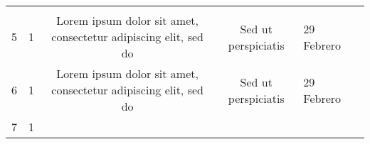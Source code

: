\documentclass[]{book}
\begin{document}
\begin{longtable}[]{@{}lcccll@{}}
\begin{minipage}[t]{0.22\columnwidth}
\strut
\end{minipage}\tabularnewline
\begin{minipage}[t]{0.02\columnwidth}\raggedright\strut
5\strut
\end{minipage} & \begin{minipage}[t]{0.16\columnwidth}\centering\strut
1\strut
\end{minipage} & \begin{minipage}[t]{0.27\columnwidth}\centering\strut
Lorem ipsum dolor sit amet, consectetur adipiscing elit, sed do\strut
\end{minipage} & \begin{minipage}[t]{0.09\columnwidth}\centering\strut
Sed ut perspiciatis\strut
\end{minipage} & \begin{minipage}[t]{0.08\columnwidth}\raggedright\strut
29 Febrero\strut
\end{minipage} & \begin{minipage}[t]{0.22\columnwidth}\raggedright\strut
\strut
\end{minipage}\tabularnewline
\begin{minipage}[t]{0.02\columnwidth}\raggedright\strut
6\strut
\end{minipage} & \begin{minipage}[t]{0.16\columnwidth}\centering\strut
1\strut
\end{minipage} & \begin{minipage}[t]{0.27\columnwidth}\centering\strut
Lorem ipsum dolor sit amet, consectetur adipiscing elit, sed do\strut
\end{minipage} & \begin{minipage}[t]{0.09\columnwidth}\centering\strut
Sed ut perspiciatis\strut
\end{minipage} & \begin{minipage}[t]{0.08\columnwidth}\raggedright\strut
29 Febrero\strut
\end{minipage} & \begin{minipage}[t]{0.22\columnwidth}\raggedright\strut
\strut
\end{minipage}\tabularnewline
\begin{minipage}[t]{0.02\columnwidth}\raggedright\strut
7\strut
\end{minipage} & \begin{minipage}[t]{0.16\columnwidth}\centering\strut
1\strut
\end{minipage} & \begin{minipage}[t]{0.27\columnwidth}\centering\strut

\end{minipage}
\end{longtable}
\end{document}

